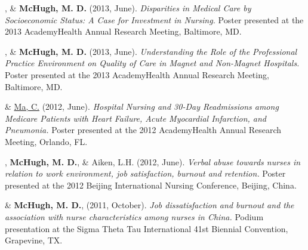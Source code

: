 \documentclass[10pt,]{article}
\begin{document}
{{{{{{{{{{{{{{{\begin{hangparas}{.25in}{1}
, \& {\textbf {McHugh, M. D.}} (2013, June). {\textit {Disparities in Medical Care by Socioeconomic Status: A Case for Investment in Nursing.}} Poster presented at the 2013 AcademyHealth Annual Research Meeting, Baltimore, MD.

\end{hangparas}

\vspace{4mm}

\begin{hangparas}{.25in}{1}

, \& {\textbf {McHugh, M. D.}} (2013, June). {\textit {Understanding the Role of the Professional Practice Environment on Quality of Care in Magnet and Non-Magnet Hospitals.}} Poster presented at the 2013 AcademyHealth Annual Research Meeting, Baltimore, MD.

\end{hangparas}

\vspace{4mm}

\begin{hangparas}{.25in}{1}

 \& {\underline {Ma, C.}} (2012, June). {\textit {Hospital Nursing and 30-Day Readmissions among Medicare Patients with Heart Failure, Acute Myocardial Infarction, and Pneumonia.}} Poster presented at the 2012 AcademyHealth Annual Research Meeting, Orlando, FL.

\end{hangparas}

\vspace{4mm}

\begin{hangparas}{.25in}{1}

, {\textbf {McHugh, M. D.}}, \& Aiken, L.H. (2012, June). {\textit {Verbal abuse towards nurses in relation to work environment, job satisfaction, burnout and retention.}} Poster presented at the 2012 Beijing International Nursing Conference, Beijing, China.

\end{hangparas}

\vspace{4mm}

\begin{hangparas}{.25in}{1}

 \& {\textbf {McHugh, M. D.}}, (2011, October). {\textit {Job dissatisfaction and burnout and the association with nurse characteristics among nurses in China.}} Podium presentation at the Sigma Theta Tau International 41st Biennial Convention, Grapevine, TX.


\end{hangparas}}}}}}}}}}}}}}}}
\end{document}
